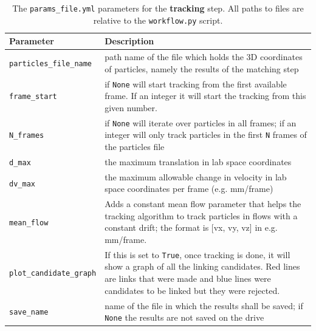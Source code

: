 \documentclass[10pt,a4paper]{article}
\begin{document}
\begin{table}[!ht]
	\centering
	\caption{The \texttt{params\_file.yml} parameters for the \textbf{tracking} step. All paths to files are relative to the \texttt{workflow.py} script.}
	\label{tab:tracking_params}
	\begin{tabular}{l m{12cm}}
		\hline
		Parameter & Description\\
		\hline
		
		\texttt{particles\_file\_name} & path name of the file which holds the 3D coordinates of particles, namely the results of the matching step  \\[.2cm]
		
		\texttt{frame\_start} & if \texttt{None} will start tracking from the first available frame. If an integer it will start the tracking from this given number. \\[.2cm]
		
		\texttt{N\_frames} & if \texttt{None} will iterate over particles in all frames; if an integer will only track particles in the first \texttt{N} frames of the particles file\\[.2cm]
		
		\texttt{d\_max} & the maximum translation in lab space coordinates \\[.2cm]
		
		\texttt{dv\_max} & the maximum allowable change in velocity in lab space coordinates per frame (e.g. mm/frame) \\[.2cm]
		
		\texttt{mean\_flow} & Adds a constant mean flow parameter that
		helps the tracking algorithm to track particles in flows with a constant drift; the format is [vx, vy, vz] in e.g. mm/frame. \\[.2cm]
		
		\texttt{plot\_candidate\_graph} & If this is set to \verb|True|, once tracking is done, it will show a graph of all the linking candidates. Red lines are links that were made and blue lines were candidates to be linked but they were rejected. \\[.2cm]
		
		
		\texttt{save\_name} & name of the file in which the results shall be saved; if \texttt{None} the results are not saved on the drive\\
		
		\hline
	\end{tabular}
\end{table}
\end{document}
